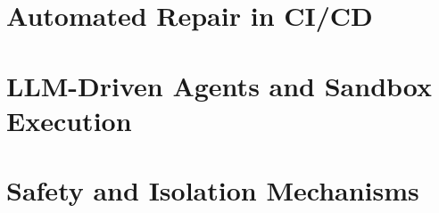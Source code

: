 \section{Automated Repair in CI/CD }
\section{LLM-Driven Agents and Sandbox Execution}
\section{Safety and Isolation Mechanisms}